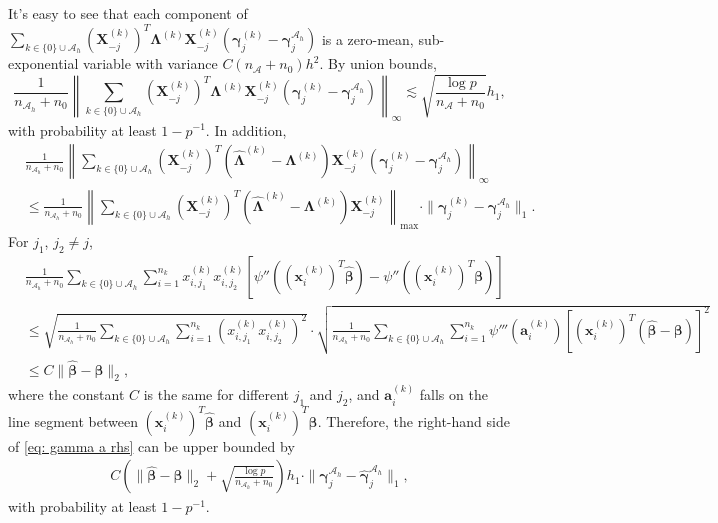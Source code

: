 \documentclass[12pt]{article}
\newcommand{\infnorma}[1]{\left\|#1\right\|_{\infty}}
\newcommand{\twonorm}[1]{\|#1\|_{2}}
\newcommand{\onenorm}[1]{\|#1\|_{1}}
\newcommand{\maxnorma}[1]{\left\|#1\right\|_{\max}}
\newcommand{\bbeta}{\bm{\beta}}
\newcommand{\hbeta}{\hat{\bm{\beta}}}
\newcommand{\bgammaah}{\bm{\gamma}^{\mah}}
\newcommand{\bgammak}[1]{\bm{\gamma}^{(#1)}}
\newcommand{\hgammaah}{\hat{\bm{\gamma}}^{\mah}}
\newcommand{\bxk}[1]{\bm{x}^{(#1)}}
\newcommand{\bXk}[1]{\bm{X}^{(#1)}}
\newcommand{\mah}{\mathcal{A}_h}
\newcommand{\na}{n_{\mathcal{A}}}
\newcommand{\nah}{n_{\mathcal{A}_h}}
\newcommand{\transet}{\{0\}\cup \mah}
\newcommand{\<}{\langle}
\renewcommand{\>}{\rangle}
\begin{document}
It's easy to see that each component of $\sum_{k \in \transet} (\bXk{k}_{-j})^T\bm{\Lambda}^{(k)}\bXk{k}_{-j}(\bgammak{k}_j - \bgammaah_j)$ is a zero-mean, sub-exponential variable with variance $C(\na+n_0)h^2$. By union bounds,
\begin{equation}
	\frac{1}{\nah+n_0}\infnorma{\sum_{k \in \transet} (\bXk{k}_{-j})^T\bm{\Lambda}^{(k)}\bXk{k}_{-j}(\bgammak{k}_j - \bgammaah_j)} \lesssim \sqrt{\frac{\log p}{\na+n_0}}h_1,
\end{equation}
with probability at least $1-p^{-1}$. In addition,
\begin{align}
	&\frac{1}{\nah+n_0}\infnorma{\sum_{k \in \transet} (\bXk{k}_{-j})^T(\widehat{\bm{\Lambda}}^{(k)} - \bm{\Lambda}^{(k)})\bXk{k}_{-j}(\bgammak{k}_j - \bgammaah_j)} \\ 
	&\leq \frac{1}{\nah+n_0} \maxnorma{\sum_{k \in \transet} (\bXk{k}_{-j})^T(\widehat{\bm{\Lambda}}^{(k)} - \bm{\Lambda}^{(k)})\bXk{k}_{-j}}\cdot \onenorm{\bgammak{k}_j - \bgammaah_j}.
\end{align}
For $j_1$, $j_2 \neq j$, 
\begin{align}
	&\frac{1}{\nah+n_0}\sum_{k \in \transet}\sum_{i=1}^{n_k}x_{i, j_1}^{(k)}x_{i, j_2}^{(k)}[\psi''((\bxk{k}_i)^T\hbeta) - \psi''((\bxk{k}_i)^T\bbeta)] \\
	&\leq \sqrt{\frac{1}{\nah+n_0}\sum_{k \in \transet}\sum_{i=1}^{n_k}(x_{i, j_1}^{(k)}x_{i, j_2}^{(k)})^2}\cdot \sqrt{\frac{1}{\nah+n_0}\sum_{k \in \transet}\sum_{i=1}^{n_k}\psi'''(\bm{a}_i^{(k)})[(\bxk{k}_i)^T(\hbeta - \bbeta)]^2} \\
	&\leq C\twonorm{\hbeta - \bbeta},
\end{align}
where the constant $C$ is the same for different $j_1$ and $j_2$, and $\bm{a}_i^{(k)}$ falls on the line segment between $(\bxk{k}_i)^T\hbeta$ and $(\bxk{k}_i)^T\bbeta$. Therefore, the right-hand side of \eqref{eq: gamma a rhs} can be upper bounded by
\begin{align}
	C\left(\twonorm{\hbeta - \bbeta} + \sqrt{\frac{\log p}{\nah+n_0}}\right)h_1\cdot \onenorm{\bgammaah_j - \hgammaah_j},
\end{align}
with probability at least $1-p^{-1}$. 
\end{document}
